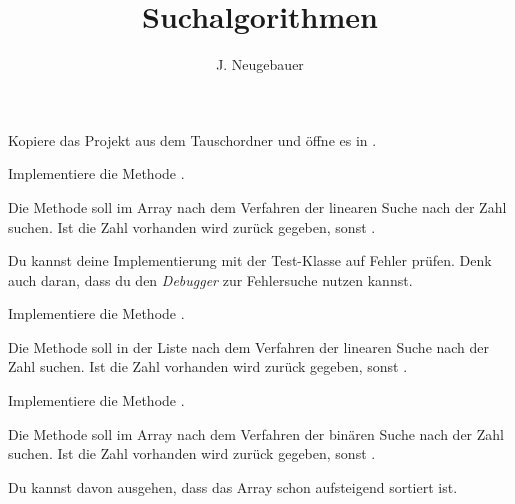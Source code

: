 \documentclass[10pt, a4paper]{scrartcl}
\author{J. Neugebauer}
\title{Suchalgorithmen}
\date{\Heute}
\begin{document}
\ReiheTitel

\begin{aufgabe}
	Kopiere das Projekt  aus dem Tauschordner und öffne es in .
	
	Implementiere die Methode .
	
	Die Methode soll im Array  nach dem Verfahren der linearen Suche nach der Zahl  suchen. Ist die Zahl vorhanden wird  zurück gegeben, sonst .
	
	Du kannst deine Implementierung mit der Test-Klasse auf Fehler prüfen. Denk auch daran, dass du den \emph{Debugger} zur Fehlersuche nutzen kannst.
\end{aufgabe}

\begin{aufgabe}
	Implementiere die Methode .
	
	Die Methode soll in der Liste  nach dem Verfahren der linearen Suche nach der Zahl  suchen. Ist die Zahl vorhanden wird  zurück gegeben, sonst .
\end{aufgabe}

\begin{aufgabe}
	Implementiere die Methode .
	
	Die Methode soll im Array  nach dem Verfahren der binären Suche nach der Zahl  suchen. Ist die Zahl vorhanden wird  zurück gegeben, sonst .
	
	Du kannst davon ausgehen, dass das Array  schon aufsteigend sortiert ist.
	
	
\end{aufgabe}
\end{document}
